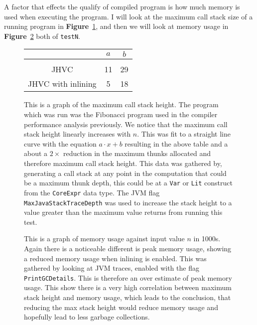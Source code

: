 \documentclass[float=false, crop=false]{standalone}
\newlength\gwidth
\newlength\gheight
\newcommand{\namefig}{\textbf{Figure}~}
\newcommand{\importMGraph}[3]{\setlength{\gwidth}{#2}\setlength{\gheight}{#3}{#1}}
\begin{document}
A factor that effects the qualify of compiled program is how much memory
is used when executing the program. I will look at the maximum call stack size
of a running program in \namefig\ref{plot:stackSize}, and then we will look at memory usage in 
\namefig\ref{plot:memUsed} both of \texttt{testN}. 

\begin{figure}
  \centering
  \importMGraph{plotCallStackGrowth}{0.96\textwidth}{0.3\textwidth}
  \begin{tabular}{ c | c c}
  & $a$ & $b$\\
  \hline\\
  JHVC & 11 & 29 \\
  JHVC with inlining & 5 & 18 
  \end{tabular}
  \caption[Plot of maximum call stack height for \texttt{testN} as a function of $n$]
  {This is a graph of the maximum call stack height. The program
  which was run was the Fibonacci program used in the compiler performance
  analysis previously. We notice that the maximum call stack height
  linearly increases with $n$. This was fit to a straight line curve
  with the equation $a\cdot x + b$ resulting in the above table and a about a $2\times$ reduction
  in the maximum thunks allocated and therefore maximum call stack height. This data
  was gathered by, generating a call stack at any point in the computation that could 
  be a maximum thunk depth, this could be at a \texttt{Var} or \texttt{Lit} construct from
  the \texttt{CoreExpr} data type. The JVM flag \texttt{MaxJavaStackTraceDepth} was used to increase
  the stack height to a value greater than the maximum value returns from running this test.}
  \label{plot:stackSize}
\end{figure}


\begin{figure}
  \centering
  \importMGraph{memUsed}{0.96\textwidth}{0.3\textwidth}
  \caption[Plot of memory used in \texttt{testN} as a function of $n$]
  {This is a graph of memory usage against input value $n$ in 1000s. 
  Again there is a noticeable different is peak memory usage, showing a
  reduced memory usage when inlining is enabled. This was gathered 
  by looking at JVM traces, enabled with the flag \texttt{PrintGCDetails}. This is therefore an 
  over estimate of peak memory usage. This show there is a very high correlation between maximum
  stack height and memory usage, which leads to the conclusion, that reducing the 
  max stack height would reduce memory usage and hopefully lead to less garbage collections.}
  \label{plot:memUsed}
\end{figure}
\end{document}
